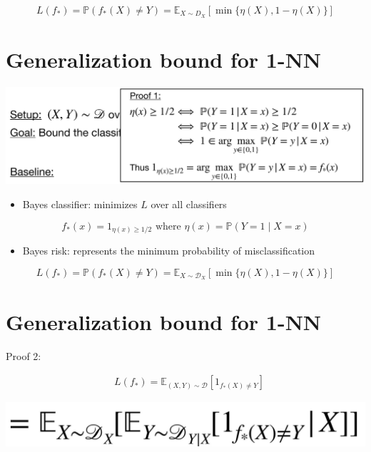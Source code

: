 \documentclass[10pt]{article}
\begin{document}
$$
L\left(f_{*}\right)=\mathbb{P}\left(f_{*}(X) \neq Y\right)=\mathbb{E}_{X \sim D_{X}}[\min \{\eta(X), 1-\eta(X)\}]
$$

\section*{Generalization bound for 1-NN}
\begin{center}
\includegraphics[max width=\textwidth]{2023_12_30_f937b0007b5d87b39f79g-29}
\end{center}

\begin{itemize}
  \item Bayes classifier: minimizes $L$ over all classifiers
\end{itemize}

$$
f_{*}(x)=1_{\eta(x) \geq 1 / 2} \text { where } \eta(x)=\mathbb{P}(Y=1 \mid X=x)
$$

\begin{itemize}
  \item Bayes risk: represents the minimum probability of misclassification
\end{itemize}

$$
L\left(f_{*}\right)=\mathbb{P}\left(f_{*}(X) \neq Y\right)=\mathbb{E}_{X \sim \mathscr{D}_{X}}[\min \{\eta(X), 1-\eta(X)\}]
$$

\section*{Generalization bound for 1-NN}
Proof 2:

$$
\begin{aligned}
& L\left(f_{*}\right)=\mathbb{E}_{(X, Y) \sim \mathscr{D}}\left[1_{f_{*}(X) \neq Y}\right]
\end{aligned}
$$

\begin{center}
\includegraphics[max width=\textwidth]{2023_12_30_f937b0007b5d87b39f79g-30}
\end{center}
\end{document}

